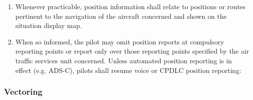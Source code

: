 \begin{enumerate}
    \item Whenever practicable, position information shall relate to positions or routes pertinent to the navigation of the aircraft concerned and shown on the situation display map.
    \item When so informed, the pilot may omit position reports at compulsory reporting points or report only over those reporting points specified by the air traffic services unit concerned. Unless automated position reporting is in effect (e.g. ADS-C), pilots shall resume voice or CPDLC position reporting:
    
\end{enumerate}

\subsubsection{Vectoring}

